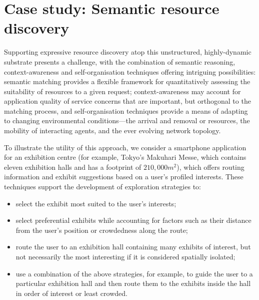 \documentclass[12pt,a4paper,twoside,openright]{book}
\begin{document}
\chapter{Case study: Semantic resource discovery}

Supporting expressive resource discovery atop this unstructured, highly-dynamic substrate presents a challenge, with the combination of semantic reasoning, context-awareness and self-organisation techniques offering intriguing possibilities: semantic matching provides a flexible framework for quantitatively assessing the suitability of resources to a given request; context-awareness may account for application quality of service concerns that are important, but orthogonal to the matching process, and self-organisation techniques provide a means of adapting to changing environmental conditions---the arrival and removal or resources, the mobility of interacting agents, and the ever evolving network topology.

To illustrate the utility of this approach, we consider a smartphone application for an exhibition centre (for example, Tokyo's Makuhari Messe, which contains eleven exhibition halls and has a footprint of $210,000m^2$), which offers routing information and exhibit suggestions based on a user's profiled interests. These techniques support the development of exploration strategies to:
\begin{itemize}
 \item select the exhibit most suited to the user's interests;
 \item select preferential exhibits while accounting for factors such as their distance from the user's position or crowdedness along the route;
 \item route the user to an exhibition hall containing many exhibits of interest, but not necessarily the most interesting if it is considered spatially isolated;
 \item use a combination of the above strategies, for example, to guide the user to a particular exhibition hall and then route them to the exhibits inside the hall in order of interest or least crowded.
\end{itemize}
\end{document}
